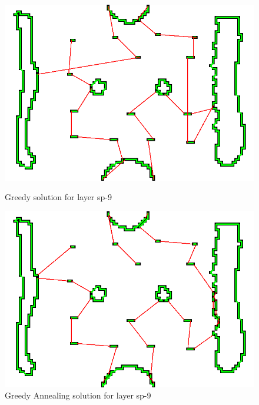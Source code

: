\documentclass[titlepage]{article}
\newcommand{\multifigcaption}{\captionsetup{justification=justified}}
\begin{document}
\begin{figure}[H]
	\begin{center}
		\begin{minipage}{.45\linewidth}
			\includegraphics[width=\textwidth]{img/results/sp-9-greedy.png}
			\multifigcaption
			\caption{Greedy solution for layer sp-9 }
			\label{img:results/sp-9-greedy}
		\end{minipage}
		\hspace{.05\linewidth}
		\begin{minipage}{.45\linewidth}
			\includegraphics[width=\textwidth]{img/results/sp-9-greedy-annealing.png}
			\multifigcaption
			\caption{Greedy Annealing solution for layer sp-9}
			\label{img:results/sp-9-greedy-annealing}
		\end{minipage}	
		
	\end{center}
\end{figure}
\end{document}
